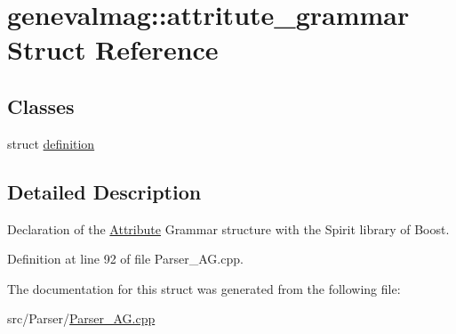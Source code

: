 \hypertarget{structgenevalmag_1_1attritute__grammar}{
\section{genevalmag::attritute\_\-grammar Struct Reference}
\label{structgenevalmag_1_1attritute__grammar}
}
\subsection*{Classes}
\begin{CompactItemize}
\item 
struct \hyperlink{structgenevalmag_1_1attritute__grammar_1_1definition}{definition}
\end{CompactItemize}


\subsection{Detailed Description}
Declaration of the \hyperlink{classgenevalmag_1_1Attribute}{Attribute} Grammar structure with the Spirit library of Boost. 

Definition at line 92 of file Parser\_\-AG.cpp.

The documentation for this struct was generated from the following file:\begin{CompactItemize}
\item 
src/Parser/\hyperlink{Parser__AG_8cpp}{Parser\_\-AG.cpp}\end{CompactItemize}
